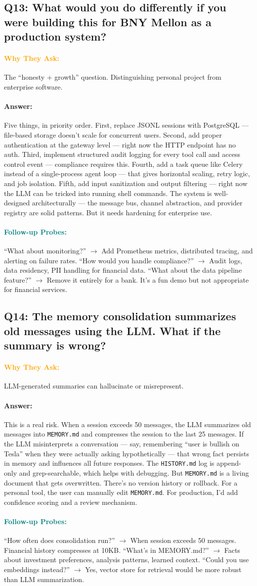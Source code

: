 \documentclass[11pt,a4paper]{article}
\newcommand{\Q}[1]{\subsection{#1}}
\newcommand{\Ans}[1]{\paragraph{\textbf{Answer:}} #1}
\newcommand{\Why}{\paragraph{\textcolor{orange}{\textbf{Why They Ask:}}}}
\newcommand{\Probe}{\paragraph{\textcolor{teal}{\textbf{Follow-up Probes:}}}}
\begin{document}
\Q{Q13: What would you do differently if you were building this for BNY Mellon as a production system?}
\Why The ``honesty + growth'' question. Distinguishing personal project from enterprise software.
\Ans Five things, in priority order. First, replace JSONL sessions with PostgreSQL --- file-based storage doesn't scale for concurrent users. Second, add proper authentication at the gateway level --- right now the HTTP endpoint has no auth. Third, implement structured audit logging for every tool call and access control event --- compliance requires this. Fourth, add a task queue like Celery instead of a single-process agent loop --- that gives horizontal scaling, retry logic, and job isolation. Fifth, add input sanitization and output filtering --- right now the LLM can be tricked into running shell commands. The system is well-designed architecturally --- the message bus, channel abstraction, and provider registry are solid patterns. But it needs hardening for enterprise use.
\Probe ``What about monitoring?'' $\rightarrow$ Add Prometheus metrics, distributed tracing, and alerting on failure rates. ``How would you handle compliance?'' $\rightarrow$ Audit logs, data residency, PII handling for financial data. ``What about the data pipeline feature?'' $\rightarrow$ Remove it entirely for a bank. It's a fun demo but not appropriate for financial services.

\Q{Q14: The memory consolidation summarizes old messages using the LLM. What if the summary is wrong?}
\Why LLM-generated summaries can hallucinate or misrepresent.
\Ans This is a real risk. When a session exceeds 50 messages, the LLM summarizes old messages into \texttt{MEMORY.md} and compresses the session to the last 25 messages. If the LLM misinterprets a conversation --- say, remembering ``user is bullish on Tesla'' when they were actually asking hypothetically --- that wrong fact persists in memory and influences all future responses. The \texttt{HISTORY.md} log is append-only and grep-searchable, which helps with debugging. But \texttt{MEMORY.md} is a living document that gets overwritten. There's no version history or rollback. For a personal tool, the user can manually edit \texttt{MEMORY.md}. For production, I'd add confidence scoring and a review mechanism.
\Probe ``How often does consolidation run?'' $\rightarrow$ When session exceeds 50 messages. Financial history compresses at 10KB. ``What's in MEMORY.md?'' $\rightarrow$ Facts about investment preferences, analysis patterns, learned context. ``Could you use embeddings instead?'' $\rightarrow$ Yes, vector store for retrieval would be more robust than LLM summarization.
\end{document}
